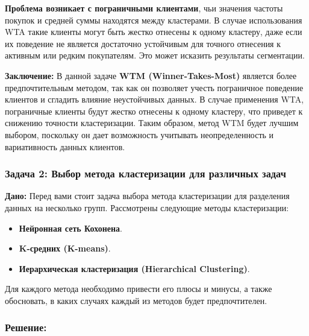 \textbf{Проблема возникает с пограничными клиентами}, чьи значения частоты покупок и средней суммы находятся между кластерами. В случае использования WTA такие клиенты могут быть жестко отнесены к одному кластеру, даже если их поведение не является достаточно устойчивым для точного отнесения к активным или редким покупателям. Это может исказить результаты сегментации.

\textbf{Заключение:}
В данной задаче \textbf{WTM (Winner-Takes-Most)} является более предпочтительным методом, так как он позволяет учесть пограничное поведение клиентов и сгладить влияние неустойчивых данных. В случае применения WTA, пограничные клиенты будут жестко отнесены к одному кластеру, что приведет к снижению точности кластеризации. Таким образом, метод WTM будет лучшим выбором, поскольку он дает возможность учитывать неопределенность и вариативность данных клиентов.

\subsubsection{Задача 2: Выбор метода кластеризации для различных задач}

\textbf{Дано:}
Перед вами стоит задача выбора метода кластеризации для разделения данных на несколько групп. Рассмотрены следующие методы кластеризации:
\begin{itemize}
    \item \textbf{Нейронная сеть Кохонена}.
    \item \textbf{K-средних (K-means)}.
    \item \textbf{Иерархическая кластеризация (Hierarchical Clustering)}.
\end{itemize}

Для каждого метода необходимо привести его плюсы и минусы, а также обосновать, в каких случаях каждый из методов будет предпочтителен.

\subsubsection{Решение:}

